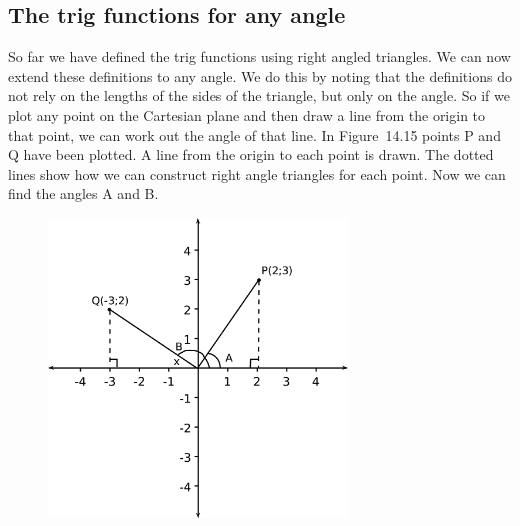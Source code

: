             \subsection{ The trig functions for any angle}
            \nopagebreak
            \label{m39411*eip-156}So far we have defined the trig functions using right angled triangles. We can now extend these definitions to any angle. We do this by noting that the definitions do not rely on the lengths of the sides of the triangle, but only on the angle. So if we plot any point on the Cartesian plane and then draw a line from the origin to that point, we can work out the angle of that line. In Figure~14.15 points P and Q have been plotted. A line from the origin to each point is drawn. The dotted lines show how we can construct right angle triangles for each point. Now we can find the angles A and B.
\par \label{m39411*eip-970}
    \setcounter{subfigure}{0}


	\begin{figure}[H] %
    \begin{center}
    \label{m39411*id63458!!!underscore!!!media}\label{m39411*id63458!!!underscore!!!printimage}\includegraphics[width=300px]{col11306.imgs/m39411_trigfunc1.png} %
        
      \vspace{2pt}
    \vspace{.1in}
    
    \end{center}

 \end{figure}   

